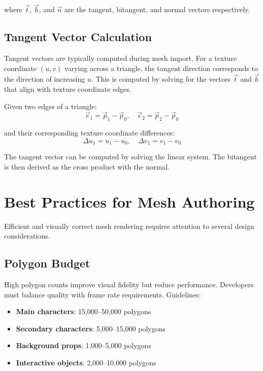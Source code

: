 where $\vec{t}$, $\vec{b}$, and $\vec{n}$ are the tangent, bitangent, and normal vectors respectively.

\needspace{5\baselineship}
\subsection{Tangent Vector Calculation}

Tangent vectors are typically computed during mesh import. For a texture coordinate $(u, v)$ varying across a triangle, the tangent direction corresponds to the direction of increasing $u$. This is computed by solving for the vectors $\vec{t}$ and $\vec{b}$ that align with texture coordinate edges.

Given two edges of a triangle:
\begin{equation}
    \vec{e}_1 = \vec{p}_1 - \vec{p}_0, \quad \vec{e}_2 = \vec{p}_2 - \vec{p}_0
\end{equation}

and their corresponding texture coordinate differences:
\begin{equation}
    \Delta u_1 = u_1 - u_0, \quad \Delta v_1 = v_1 - v_0
\end{equation}

The tangent vector can be computed by solving the linear system. The bitangent is then derived as the cross product with the normal.

\needspace{6\baselineship}
\section{Best Practices for Mesh Authoring}

Efficient and visually correct mesh rendering requires attention to several design considerations.

\needspace{5\baselineship}
\subsection{Polygon Budget}

High polygon counts improve visual fidelity but reduce performance. Developers must balance quality with frame rate requirements. Guidelines:

\begin{itemize}
    \item \textbf{Main characters}: 15,000–50,000 polygons
    \item \textbf{Secondary characters}: 5,000–15,000 polygons
    \item \textbf{Background props}: 1,000–5,000 polygons
    \item \textbf{Interactive objects}: 2,000–10,000 polygons
\end{itemize}

